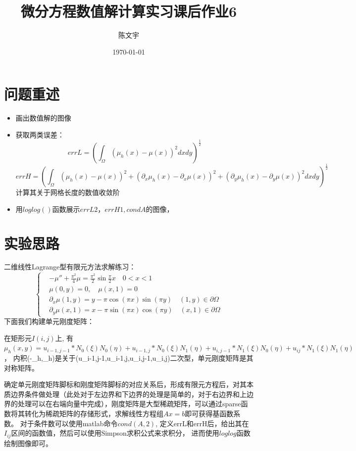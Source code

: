 \documentclass{article}
\title{微分方程数值解计算实习课后作业6}
\author{陈文宇}
\date{\today}
\begin{document}
\maketitle

\tableofcontents

\newpage
\section{问题重述}

\begin{itemize}
    \item 画出数值解的图像
    \item 获取两类误差：
    $$ errL=(\int_{\Omega}(\mu_{h}(x)-\mu(x))^{2}dxdy)^{\frac{1}{2}}$$
    $$ errH=(\int_{\Omega}(\mu_{h}(x)-\mu(x))^{2}+(\partial_{x}\mu_{h}(x)-\partial_{x}\mu(x))^{2}+(\partial_{y}\mu_{h}(x)-\partial_{y}\mu(x))^{2}dxdy)^{\frac{1}{2}}$$
    计算其关于网格长度的数值收敛阶
    \item 用$loglog()$函数展示$errL2，errH1,condA$的图像，
\end{itemize}
 
\section{实验思路}
二维线性Lagrange型有限元方法求解练习：
\[
\left\{
\begin{aligned}
	&-\mu '' + \frac{\pi^{2}}{4}\mu = \frac{\pi^{2}}{2}\sin{\frac{\pi}{2}x} \quad0<x<1 
	\\
	&\mu(0,y)=0 ,\quad \mu(x,1)=0 
        \\
        &\partial_{x}\mu(1,y)=y-\pi\cos(\pi x)\sin(\pi y) \quad (1,y)\in\partial\Omega
        \\
        &\partial_{y}\mu(x,1)=x-\pi\sin(\pi x)\cos(\pi y) \quad (x,1)\in\partial\Omega
\end{aligned}
\right.
\]
下面我们构建单元刚度矩阵：

在矩形元$I(i,j)$上,
有$\mu_{h}(x,y)=u_{i-1,j-1}*N_{0}(\xi)N_{0}(\eta)+u_{i-1,j}*N_{0}(\xi)N_{1}(\eta)+u_{i,j-1}*N_{1}(\xi)N_{0}(\eta)+u_{ij}*N_{1}(\xi)N_{1}(\eta)$，
内积(-\delta\mu_{h},\mu_{h})是关于(u_{i-1,j-1},u_{i-1,j},u_{i,j-1},u_{i,j})二次型，单元刚度矩阵是其对称矩阵。

确定单元刚度矩阵脚标和刚度矩阵脚标的对应关系后，形成有限元方程后，对其本质边界条件做处理（此处对于左边界和下边界的处理是简单的，对于右边界和上边界的处理可以在右端向量中完成），刚度矩阵是大型稀疏矩阵，可以通过sparse函数将其转化为稀疏矩阵的存储形式，求解线性方程组$Ax=b$即可获得基函数系数。
对于条件数可以使用matlab命令$cond(A,2)$,
定义errL和errH后，给出其在$ I_{ij} $区间的函数值，然后可以使用Simpson求积公式来求积分，
进而使用$loglog$函数绘制图像即可。
\end{document}
